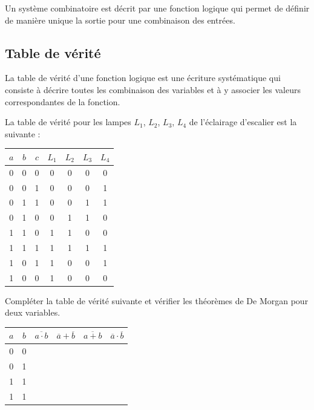 \documentclass[11pt,oneside]{article}
\begin{document}
Un système combinatoire est décrit par une fonction logique qui permet de définir de manière unique la sortie pour une combinaison des entrées. 

\subsection{Table de vérité}
La table de vérité d'une fonction logique est une écriture systématique qui consiste à décrire toutes les combinaison des variables et à y associer les valeurs correspondantes de la fonction. 

\begin{exemple}
La table de vérité pour les lampes $L_1$, $L_2$, $L_3$, $L_4$ de l'éclairage d'escalier est la suivante :
\begin{center}
\begin{tabular}[c]{|c|c|c||c|c|c|c|}
\hline 
$a$ & $b$ & $c$ & $L_1$ & $L_2$ & $L_3$ & $L_4$ \\
\hline \hline
0 & 0 & 0 & 0 & 0 & 0 & 0 \\ \hline
0 & 0 & 1 & 0 & 0 & 0 & 1 \\ \hline
0 & 1 & 1 & 0 & 0 & 1 & 1 \\ \hline
0 & 1 & 0 & 0 & 1 & 1 & 0 \\ \hline
1 & 1 & 0 & 1 & 1 & 0 & 0 \\ \hline
1 & 1 & 1 & 1 & 1 & 1 & 1 \\ \hline
1 & 0 & 1 & 1 & 0 & 0 & 1 \\ \hline
1 & 0 & 0 & 1 & 0 & 0 & 0 \\ \hline 
\end{tabular}
\end{center}

Compléter la table de vérité suivante et vérifier les théorèmes de De Morgan pour deux variables.
\begin{center}
\begin{tabular}[c]{|c|c||c|c|c|c|}
\hline
$a$ & $b$ & $\overline{a\cdot b}$ & $\overline{a} + \overline{b}$ & $\overline{a+b}$ & $\overline{a}\cdot\overline{b}$ \\
\hline \hline 
0 & 0 & & & & \\ \hline
0 & 1 & & & & \\ \hline
1 & 1 & & & & \\ \hline
1 & 1 & & & & \\ \hline
\end{tabular}
\end{center}

\end{exemple}
\end{document}
